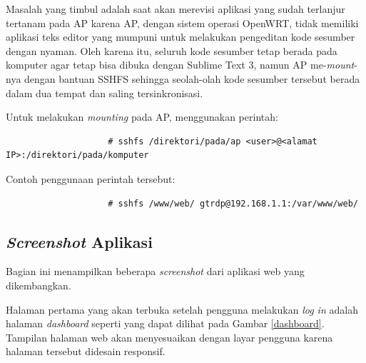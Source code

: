 			Masalah yang timbul adalah saat akan merevisi aplikasi yang sudah terlanjur tertanam pada AP karena AP, dengan sistem operasi OpenWRT, tidak memiliki aplikasi teks editor yang mumpuni untuk melakukan pengeditan kode sesumber dengan nyaman. Oleh karena itu, seluruh kode sesumber tetap berada pada komputer agar tetap bisa dibuka dengan Sublime Text 3, namun AP me-\emph{mount}-nya dengan bantuan SSHFS sehingga seolah-olah kode sesumber tersebut berada dalam dua tempat dan saling tersinkronisasi.

			Untuk melakukan \emph{mounting} pada AP, menggunakan perintah:
			\begingroup
			    \fontsize{10pt}{12pt}\selectfont
			    \begin{verbatim}
					# sshfs /direktori/pada/ap <user>@<alamat IP>:/direktori/pada/komputer
			    \end{verbatim}  
			\endgroup

			Contoh penggunaan perintah tersebut:
			\begingroup
			    \fontsize{10pt}{12pt}\selectfont
			    \begin{verbatim}
					# sshfs /www/web/ gtrdp@192.168.1.1:/var/www/web/
			    \end{verbatim}  
			\endgroup
			

		\subsection{\emph{Screenshot} Aplikasi}
			Bagian ini menampilkan beberapa \emph{screenshot} dari aplikasi web yang dikembangkan.

			Halaman pertama yang akan terbuka setelah pengguna melakukan \emph{log in} adalah halaman \emph{dashboard} seperti yang dapat dilihat pada Gambar \ref{dashboard}. Tampilan halaman web akan menyesuaikan dengan layar pengguna karena halaman tersebut didesain responsif.

